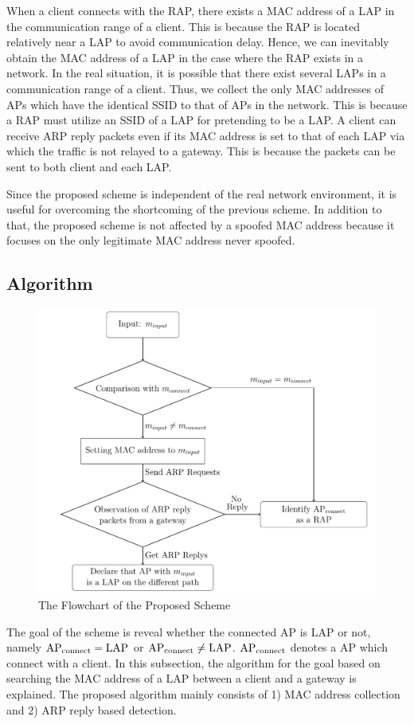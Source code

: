 \documentclass[conference]{IEEEtran}
\newcommand{\tarAP}{\rm AP_{connect}}
\begin{document}
When a client connects with the RAP, there exists a MAC address of a LAP in the communication range of a client.
This is because the RAP is located relatively near a LAP to avoid communication delay.
Hence, we can inevitably obtain the MAC address of a LAP in the case where the RAP exists in a network.
In the real situation, it is possible that there exist several LAPs in a communication range of a client.
Thus, we collect the only MAC addresses of APs which have the identical SSID to that of APs in the network.
This is because a RAP must utilize an SSID of a LAP for pretending to be a LAP.
A client can receive ARP reply packets even if its MAC address is set to that of each LAP via which the traffic is not relayed to a gateway.
This is because the packets can be sent to both client and each LAP.

Since the proposed scheme is independent of the real network environment, it is useful for overcoming the shortcoming of the previous scheme.
In addition to that, the proposed scheme is not affected by a spoofed MAC address because it focuses on the only legitimate MAC address never spoofed.

\subsection{Algorithm} \label{sec:alg}
\begin{figure}[t]
    \begin{center}
        \includegraphics[scale=0.43]{flowchart/flowchart.pdf}
        \caption{The Flowchart of the Proposed Scheme}
        \label{fig:flowchart}
    \end{center}
\vspace{-2zh}
\end{figure}
The goal of the scheme is reveal whether the connected AP is LAP or not, namely $\tarAP = LAP$ or $\tarAP \ne LAP$.
$\tarAP$ denotes a AP which connect with a client.
In this subsection, the algorithm for the goal based on searching the MAC address of a LAP between a client and a gateway is explained.
The proposed algorithm mainly consists of 1) MAC address collection and 2) ARP reply based detection.
\end{document}
